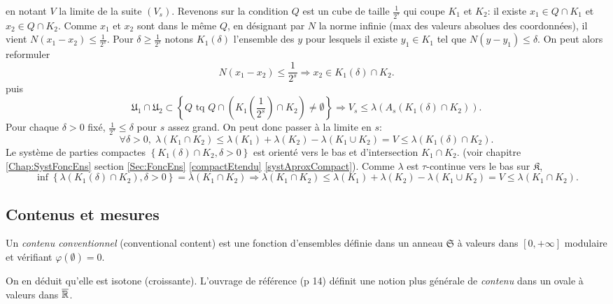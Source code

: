 \begin{demo}
en notant $V$ la limite de la suite $(V_s)$.\newline
Revenons sur la condition $Q$ est un cube de taille $\frac{1}{2^s}$ qui coupe $K_1$ et $K_2$: il existe $x_1\in Q \cap K_1$ et $x_2 \in Q \cap K_2$. Comme $x_1$ et $x_2$ sont dans le même $Q$, en désignant par $N$ la norme infinie (max des valeurs absolues des coordonnées), il vient $N(x_1-x_2)\leq \frac{1}{2^s}$. \newline
Pour $\delta \geq \frac{1}{2^s}$ notons $K_1(\delta)$ l'ensemble des $y$ pour lesquels il existe $y_1\in K_1$ tel que $N(y-y_1)\leq \delta$. On peut alors reformuler
\begin{displaymath}
 N(x_1-x_2)\leq \frac{1}{2^s} \Rightarrow x_2 \in K_1(\delta)\cap K_2.
\end{displaymath}
puis
\begin{displaymath}
 \mathfrak{U}_1 \cap \mathfrak{U}_2 \subset
 \left\lbrace Q \text{ tq } Q\cap (K_1(\frac{1}{2^s})\cap K_2 )\neq \emptyset \right\rbrace
 \Rightarrow
 V_s \leq \lambda(A_s(K_1(\delta)\cap K_2)).
\end{displaymath}
Pour chaque $\delta >0$ fixé, $\frac{1}{2^s}\leq \delta$ pour $s$  assez grand. On peut donc passer à la limite en $s$:
\begin{displaymath}
 \forall \delta > 0, \; \lambda(K_1 \cap K_2) \leq  \lambda(K_1) + \lambda(K_2) - \lambda(K_1 \cup K_2) = V \leq \lambda(K_1(\delta)\cap K_2).
\end{displaymath}
Le système de parties compactes $\left\lbrace K_1(\delta)\cap K_2, \delta > 0 \right\rbrace$ est orienté vers le bas et d'intersection $K_1 \cap K_2$. (voir chapitre \ref{Chap:SystFoncEns}  section \ref{Sec:FoncEns} \ref{compactEtendu} \ref{systAproxCompact}). Comme $\lambda$ est $\tau$-continue vers le bas sur $\mathfrak{K}$,
\begin{displaymath}
 \inf\left\lbrace \lambda(K_1(\delta)\cap K_2), \delta > 0 \right\rbrace =  \lambda(K_1 \cap K_2)
 \Rightarrow
 \lambda(K_1 \cap K_2) \leq  \lambda(K_1) + \lambda(K_2) - \lambda(K_1 \cup K_2) = V \leq \lambda(K_1 \cap K_2).
\end{displaymath}
\end{demo}


\subsection{Contenus et mesures} \label{SubSec:ContenusMesures}
\begin{defi}
Un \emph{contenu conventionnel} (conventional content) est une fonction d'ensembles définie dans un anneau $\mathfrak{S}$ à valeurs dans $[0,+\infty]$ modulaire et vérifiant $\varphi(\emptyset)=0$.
\end{defi}
\noindent On en déduit qu'elle est isotone (croissante). L'ouvrage de référence (p 14) définit une notion plus générale de \emph{contenu} dans un ovale à valeurs dans $\overline{\mathbb{R}}$.

